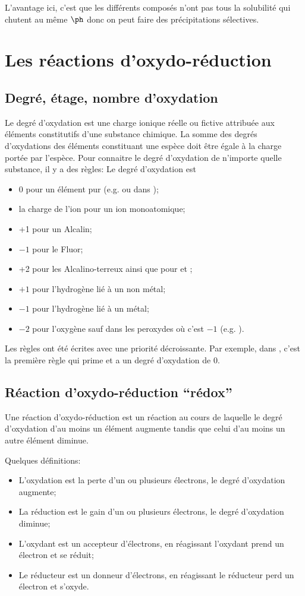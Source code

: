 L'avantage ici, c'est que les différents composés n'ont pas tous la
solubilité qui chutent au même $\ph$ donc on peut faire
des précipitations sélectives.

\section{Les réactions d'oxydo-réduction}
\subsection{Degré, étage, nombre d'oxydation}
Le degré d'oxydation est une charge ionique réelle ou fictive attribuée
aux éléments constitutifs d'une substance chimique.
La somme des degrés d'oxydations des éléments constituant une espèce
doit être égale à la charge portée par l'espèce.
Pour connaitre le degré d'oxydation de n'importe quelle substance,
il y a des règles:
Le degré d'oxydation est
\begin{itemize}
  \item $0$ pour un élément pur (e.g.  ou  dans );
  \item la charge de l'ion pour un ion monoatomique;
  \item +1 pour un Alcalin;
  \item $-1$ pour le Fluor;
  \item +2 pour les Alcalino-terreux ainsi que pour  et ;
  \item $+1$ pour l'hydrogène lié à un non métal;
  \item $-1$ pour l'hydrogène lié à un métal;
  \item $-2$ pour l'oxygène sauf dans les peroxydes
    où c'est $-1$ (e.g. ).
\end{itemize}

Les règles ont été écrites avec une priorité décroissante.
Par exemple, dans , c'est la première règle qui prime et
 a un degré d'oxydation de 0.

\subsection{Réaction d'oxydo-réduction ``rédox''}
Une réaction d'oxydo-réduction est un réaction au cours de laquelle
le degré d'oxydation d'au moins un élément augmente tandis que celui
d'au moins un autre élément diminue.

Quelques définitions:

\begin{itemize}
  \item L'oxydation est la perte d'un ou plusieurs électrons,
    le degré d'oxydation augmente;
  \item La réduction est le gain d'un ou plusieurs électrons,
    le degré d'oxydation diminue;
  \item L'oxydant est un accepteur d'électrons,
    en réagissant l'oxydant prend un électron et se réduit;
  \item Le réducteur est un donneur d'électrons,
    en réagissant le réducteur perd un électron et s'oxyde.
\end{itemize}

